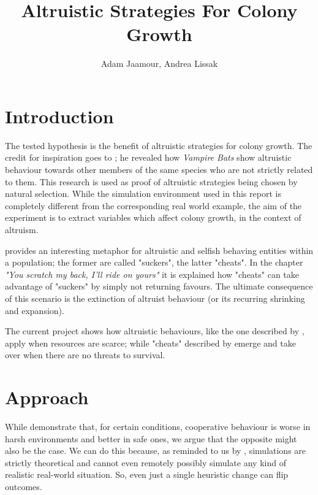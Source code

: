 \documentclass[a4paper,12pt,twocolumn]{article}
\title{Altruistic Strategies For Colony Growth}
\author{Adam Jaamour, Andrea Lissak}
\begin{document}
\maketitle
\clearpage

\section{Introduction}
\begin{flushleft}
The tested hypothesis is the benefit of altruistic strategies for colony growth. The credit for inspiration goes to \citet{bats}; he revealed how \textit{Vampire Bats} show altruistic behaviour towards other members of the same species who are not strictly related to them. This research is used as proof of altruistic strategies being chosen by natural selection. While the simulation environment used in this report is completely different from the corresponding real world example, the aim of the experiment is to extract variables which affect colony growth, in the context of altruism.
\end{flushleft}
\begin{flushleft}
\citet{dawkins} provides an interesting metaphor for altruistic and selfish behaving entities within a population; the former are called "suckers", the latter "cheats". In the chapter \textit{"You scratch my back, I'll ride on yours"} \cite[p. 165]{dawkins} it is explained how "cheats" can take advantage of "suckers" by simply not returning favours. The ultimate consequence of this scenario is the extinction of altruist behaviour (or its recurring shrinking and expansion).
\end{flushleft}

\begin{flushleft}
The current project shows how altruistic behaviours, like the one described by \citet{bats}, apply when resources are scarce; while "cheats" described by \citet{dawkins} emerge and take over when there are no threats to survival.
\end{flushleft}


\section{Approach}
\begin{flushleft}
While \citet{smaldino} demonstrate that, for certain conditions, cooperative behaviour is worse in harsh environments and better in safe ones, we argue that the opposite might also be the case. We can do this because, as reminded to us by \citet{bryson}, simulations are strictly theoretical and cannot even remotely possibly simulate any kind of realistic real-world situation. So, even just a single heuristic change can flip outcomes.
\end{flushleft}
\end{document}
